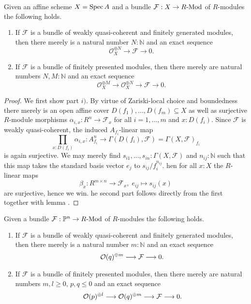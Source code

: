 \begin{proposition}
  \label{wqc+fg-bundle-is-explicitly-generated}
  Given an affine scheme $X=\operatorname{Spec} A$ and a bundle $\mathcal F : X \to R\text{-}\mathrm{Mod}$ of $R$-modules the following holds.
  \begin{enumerate}
    \item[i)] If $\mathcal F$ is a bundle of weakly quasi-coherent and finitely generated modules, then there merely is a natural number $N : \mathbb N$ and an exact sequence
    \[
      \mathcal O_X^{\oplus N} \longrightarrow \mathcal F \longrightarrow 0.
    \]
    \item[ii)] If $\mathcal F$ is a bundle of finitely presented modules, then there merely are natural numbers $N,M : \mathbb N$ and an exact sequence
    \[
      \mathcal O_X^{\oplus M} \longrightarrow \mathcal O_X^{\oplus N} \longrightarrow \mathcal F \longrightarrow 0.
    \]
  \end{enumerate}
\end{proposition}

\begin{proof}
  We first show part $i)$.
  By virtue of Zariski-local choice and boundedness there merely is an open affine cover $D(f_1), ..., D(f_m) \subseteq X$ as well as surjective $R$-module morphisms $\alpha_{i,x} : R^n \to \mathcal F_x$ for all $i=1, ..., m$ and $x:D(f_i)$.
  Since $\mathcal F$ is weakly quasi-coherent, the induced $A_{f_i}$-linear map
  \[
    \textstyle\prod_{x:D(f_i)}\alpha_{i,x} :  A_{f_i}^n \longrightarrow \Gamma (D(f_i),\mathcal F) = \Gamma (X,\mathcal F)_{f_i}
  \]
  is again surjective. We may merely find $s_{i1}, ..., s_{in}:\Gamma (X,\mathcal F)$ and $n_{ij}:\mathbb{N}$ such that this map takes the standard basis vector $e_j$ to $s_{ij}/f_i^{n_{ij}}$.
  hen for all $x:X$ the $R$-linear maps
  \[
    \beta_x : R^{m \times n} \longrightarrow \mathcal F_x, \;
    e_{ij} \longmapsto s_{ij}(x)
  \]
  are surjective, hence we win.
  he second part follows directly from the first together with lemma \cite[Chapter IV, 1.0 Lemma]{lombardi-quitte}.
\end{proof}

\begin{proposition}
  \label{fp-module-bundle-globally-generated}
  Given a bundle $\mathcal F : \mathbb{P}^n \to R\text{-}\mathrm{Mod}$ of $R$-modules the following holds.
  \begin{enumerate}
    \item[i)] If $\mathcal F$ is a bundle of weakly quasi-coherent and finitely generated modules, then there merely is a natural number $m : \mathbb N$ and an exact sequence
    \[
      \mathcal O(q)^{\oplus m}\longrightarrow \mathcal F \longrightarrow 0 \rlap{.}
    \]
    \item[ii)] If $\mathcal F$ is a bundle of finitely presented modules, then there merely are natural numbers $m,l\geq 0$, $p ,q\leq 0$ and an exact sequence
    \[
      \mathcal O(p)^{\oplus l}     \longrightarrow
      \mathcal O(q)^{\oplus m}     \longrightarrow
      \mathcal F\longrightarrow 0  \rlap{.}
    \]
  \end{enumerate}
\end{proposition}

